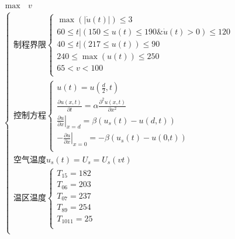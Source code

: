 \documentclass[withoutpreface,bwprint]{cumcmthesis} %
\begin{document}
\begin{equation}\label{p2}
	\begin{gathered}
	\max\text{ }v
\\
\begin{cases}
\text{制程界限}\begin{cases}
\max \left( \left| \dot{u}\left( t \right) \right| \right) \leqslant 3\\
60\leqslant \left. t \right|\left( 150\leqslant u\left( t \right) \leqslant \text{190\&}\dot{u}\left( t \right) >0 \right) \leqslant 120\\
40\leqslant \left. t \right|\left( 217\leqslant u\left( t \right) \right) \leqslant 90\\
240\leqslant \max \left( u\left( t \right) \right) \leqslant 250\\
65<v<100\\
\end{cases}\\
\text{控制方程}\left\{ \begin{array}{l}
u(t)=u(\frac{d}{2},t)\\
\frac{\partial u\left( x,t \right)}{\partial t}=\alpha \frac{\partial ^2u\left( x,t \right)}{\partial x^2}\\
\left. \frac{\partial u}{\partial x} \right|_{x=d}=\beta \left( u_s\left( t \right) -u\left( d,t \right) \right)\\
-\left. \frac{\partial u}{\partial x} \right|_{x=0}=-\beta \left( u_s\left( t \right) -u\left( \text{0,}t \right) \right)\\
\end{array} \right.\\
\text{空气温度}u_s\left( t \right) =U_s=U_s\left( vt \right)\\
\text{温区温度}\begin{cases}
T_{15}=182\\
T_{06}=203\\
T_{07}=237\\
T_{89}=254\\
T_{1011}=25\\
\end{cases}\\
\end{cases}
	\end{gathered}
\end{equation}
\end{document}
